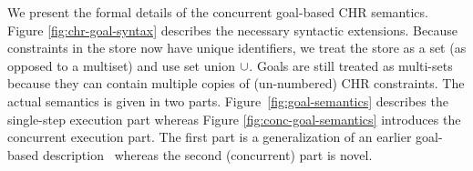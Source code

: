 \documentclass{tlp}
\begin{document}
We present the formal details of the concurrent goal-based CHR semantics. Figure 
\ref{fig:chr-goal-syntax} describes the necessary syntactic extensions. Because
constraints in the store now have unique identifiers, we treat the store as a
set (as opposed to a multiset) and use set union $\cup$. Goals are still treated as multi-sets
because they can contain multiple copies of (un-numbered) CHR constraints.
The actual semantics is given in two parts. Figure~\ref{fig:goal-semantics} 
describes the single-step execution part whereas
Figure \ref{fig:conc-goal-semantics} introduces the concurrent execution part.
The first part is a generalization of an earlier goal-based description~\cite{greg:thesis}
whereas the second (concurrent) part is novel.



\end{document}
